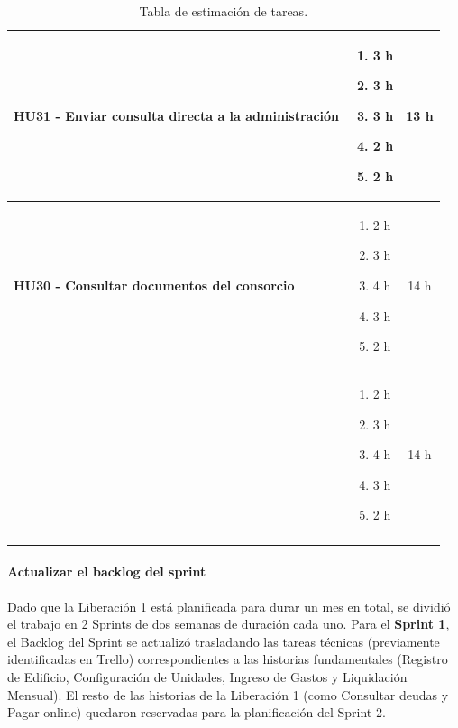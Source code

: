 \begin{longtable}{|p{10.5cm}|p{2.5cm}|c|}
            \textbf{HU31 - Enviar consulta directa a la administración} 
        
        &

            \begin{enumerate}[leftmargin=*,nosep]
                \item 3 h
                \item 3 h
                \item 3 h
                \item 2 h
                \item 2 h
            \end{enumerate} 
        
        &
            13 h
    
    \\ \hline
        
            \textbf{HU30 - Consultar documentos del consorcio} 
        
        &

            \begin{enumerate}[leftmargin=*,nosep]
                \item 2 h
                \item 3 h
                \item 4 h
                \item 3 h
                \item 2 h
            \end{enumerate} 
        
        &
            14 h
    
    \\ \hline
        
        &

        \begin{enumerate}[leftmargin=*,nosep]
          \item 2 h
          \item 3 h
          \item 4 h
          \item 3 h
          \item 2 h
        \end{enumerate} 
        
        &
         14 h \\ \hline
        
    \caption{Tabla de estimación de tareas.}
\end{longtable}

\paragraph{Actualizar el backlog del sprint}
Dado que la Liberación 1 está planificada para durar un mes en total, se dividió el trabajo en 2 Sprints de dos semanas de duración cada uno. Para el \textbf{Sprint 1}, el Backlog del Sprint se actualizó trasladando las tareas técnicas (previamente identificadas en Trello) correspondientes a las historias fundamentales (Registro de Edificio, Configuración de Unidades, Ingreso de Gastos y Liquidación Mensual). El resto de las historias de la Liberación 1 (como Consultar deudas y Pagar online) quedaron reservadas para la planificación del Sprint 2.

